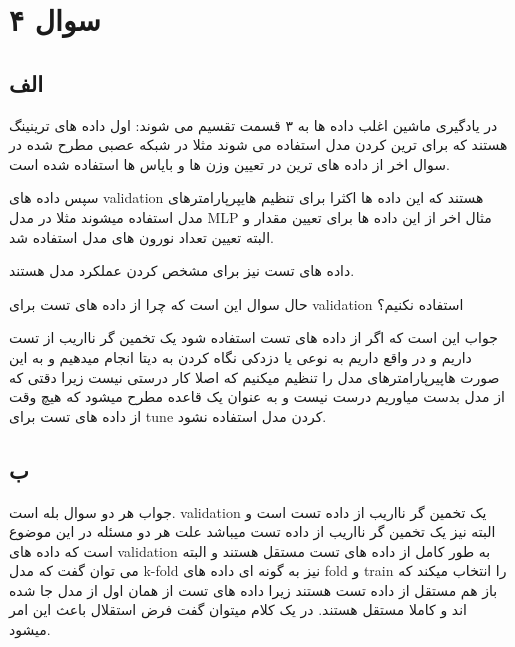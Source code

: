\documentclass{article}[12pt]
\begin{document}
\clearpage
\section{سوال ۴}

\subsection{الف}
در یادگیری ماشین اغلب داده ها به ۳ قسمت تقسیم می شوند:
اول داده های ترینینگ هستند که برای ترین کردن مدل استفاده می شوند مثلا در شبکه عصبی مطرح شده در سوال اخر از داده های ترین در تعیین وزن ها و بایاس ها استفاده شده است. 

سپس داده های 
validation 
هستند که این داده ها اکثرا برای تنظیم هایپرپارامترهای مدل استفاده میشوند مثلا در مدل MLP
مثال اخر از این داده ها برای تعیین مقدار 
و البته تعیین تعداد نورون های مدل استفاده شد. 

داده های تست نیز برای مشخص کردن عملکرد مدل هستند. 

حال سوال این است که چرا از داده های تست برای 
validation 
استفاده نکنیم؟

جواب این است که اگر از داده های تست استفاده شود یک تخمین گر نااریب از تست داریم و در واقع داریم به نوعی 
یا دزدکی نگاه کردن به دیتا انجام میدهیم و به این صورت هاپیرپارامترهای مدل را تنظیم میکنیم که اصلا کار درستی نیست زیرا دقتی که از مدل بدست میاوریم درست نیست و به عنوان یک قاعده مطرح میشود که هیچ وقت از داده های تست برای 
tune 
کردن مدل استفاده نشود. 
\subsection{ب}

جواب هر دو سوال بله است. 
validation 
یک تخمین گر نااریب از داده تست است و البته
نیز یک تخمین گر نااریب از داده تست میباشد علت هر دو مسئله در این موضوع است که داده های 
validation 
به طور کامل از داده های تست مستقل هستند و البته می توان گفت که مدل 
k-fold 
نیز به گونه ای داده های fold و train را انتخاب میکند که باز هم مستقل از داده تست هستند زیرا داده های تست از همان اول از مدل جا شده اند و کاملا مستقل هستند. در یک کلام میتوان گفت فرض استقلال باعث این امر میشود. 
\end{document}
